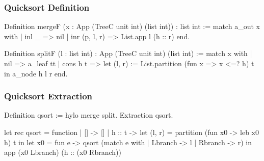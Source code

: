 \begin{frame}[fragile]
  \frametitle{Quicksort Definition}

  \begin{coqcode}
Definition mergeF (x : App (TreeC unit int) (list int)) : list int :=
  match a_out x with
  | inl _ => nil
  | inr (p, l, r) => List.app l (h :: r)
  end.

Definition splitF (l : list int) : App (TreeC unit int) (list int) :=
  match x with
  | nil => a_leaf tt
  | cons h t => let (l, r) := List.partition (fun x => x <=? h) t in
                a_node h l r
  end.
  \end{coqcode}
\end{frame}

\begin{frame}[fragile]
  \frametitle{Quicksort Extraction}
    \begin{minipage}{.86\columnwidth}
    \begin{bluebox}
    \begin{coqcode}
Definition qsort := hylo merge split.
Extraction qsort.
    \end{coqcode}
    \end{bluebox}
    \end{minipage}

  \vspace{.6cm}

    \begin{overprint}
    \begin{minipage}{.86\columnwidth}
    \begin{greenbox}
    \begin{ocamlcode}
let rec qsort = function
| [] -> []
| h :: t ->
  let (l, r) = partition (fun x0 -> leb x0 h) t in
  let x0 = fun e -> qsort (match e with
                           | Lbranch -> l
                           | Rbranch -> r) in
  app (x0 Lbranch) (h :: (x0 Rbranch))
    \end{ocamlcode}
    \end{greenbox}
    \end{minipage}
    \end{overprint}
\end{frame}

